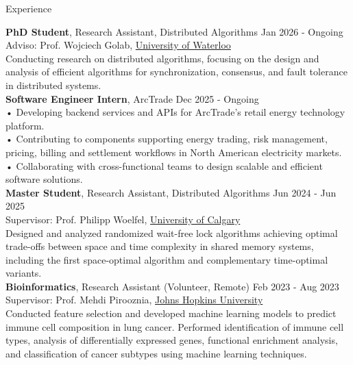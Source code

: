 \documentclass{resume} %
\begin{document}
\begin{rSection}{Experience}

{\bf PhD Student}{, Research Assistant, Distributed Algorithms \hfill {Jan 2026 - Ongoing}\\ Adviso: Prof. Wojciech Golab, \href{https://uwaterloo.ca//}{University of Waterloo}}\\
Conducting research on distributed algorithms, focusing on the design and analysis of efficient algorithms for synchronization, consensus, and fault tolerance in distributed systems.\\
{\bf Software Engineer Intern}{, ArcTrade} \hfill {Dec 2025 - Ongoing}\\
• Developing backend services and APIs for ArcTrade's retail energy technology platform.\\
• Contributing to components supporting energy trading, risk management, pricing, billing and settlement workflows in North American electricity markets.\\
• Collaborating with cross-functional teams to design scalable and efficient software solutions.\\
{\bf Master Student}{, Research Assistant, Distributed Algorithms \hfill {Jun 2024 - Jun 2025}\\ Supervisor: Prof. Philipp Woelfel, \href{https://www.ucalgary.ca/}{University of Calgary}}\\
Designed and analyzed randomized wait-free lock algorithms achieving optimal trade-offs between space and time complexity in shared memory systems, including the first space-optimal algorithm and complementary time-optimal variants.\\
{\bf Bioinformatics}{, Research Assistant (Volunteer, Remote) \hfill { Feb 2023 - Aug 2023}\\ Supervisor: Prof. Mehdi Pirooznia, \href{https://www.jhu.edu/}{Johns Hopkins University}}\\
Conducted feature selection and developed machine learning models to predict immune cell composition in lung cancer. Performed identification of immune cell types, analysis of differentially expressed genes, functional enrichment analysis, and classification of cancer subtypes using machine learning techniques.\\

\end{rSection}
\end{document}
